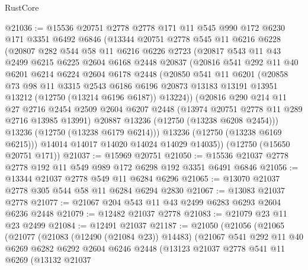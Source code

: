 \begin{lexlean}{RustCore}
\begin{coremodule}
@21036 := @15536
    @20751
    @2778
    @2778
    @171
    @11
    @545
    @990
    @172
    @6230
    @171
    @3351
    @6492
    @6846
    (@13344
      @20751
      @2778
      @545
      @11
      @6216
      @6228
      (@20807
        @282
        @544
        @58
        @11
        @6216
        @6226
        @2723
        (@20817
          @543
          @11
          @43
          @2499
          @6215
          @6225
          @2604
          @6168
          @2448
          @20837
          (@20816
            @541
            @292
            @11
            @40
            @6201
            @6214
            @6224
            @2604
            @6178
            @2448
            (@20850
              @541
              @11
              @6201
              (@20858
                @73
                @98
                @11
                @3315
                @2543
                @6186
                @6196
                @20873
                @13183
                @13191
                @13951
                @13212
                (@12750 (@13214 @6196 @6187))
                @13224))
            (@20816
              @290
              @214
              @11
              @27
              @2716
              @2454
              @2509
              @2604
              @6207
              @2448
              (@13974 @20751 @2778 @11 @289 @2716 @13985 @13991)
              @20887
              @13236
              (@12750 (@13238 @6208 @2454)))
            @13236
            (@12750 (@13238 @6179 @6214)))
          @13236
          (@12750 (@13238 @6169 @6215)))
        @14014
        @14017
        @14020
        @14024
        @14029
        @14035))
    (@12750 (@15650 @20751 @171))
@21037 := @15969 @20751
@21050 := @15536 @21037 @2778 @2778 @192 @11 @549 @989 @172 @6298 @192 @3351 @6491 @6846
@21056 := @13344 @21037 @2778 @549 @11 @6284 @6296
@21065 := @13070 @21037 @2778 @305 @544 @58 @11 @6284 @6294 @2830
@21067 := @13083 @21037 @2778
@21077 := @21067 @204 @543 @11 @43 @2499 @6283 @6293 @2604 @6236 @2448
@21079 := @12482 @21037 @2778
@21083 := @21079 @23 @11 @23 @2499
@21084 := @12491 @21037
@21187 := @21050
    (@21056
      (@21065
        (@21077
          (@21083 (@12490 (@21084 @23)) @14483)
          (@21067
            @541
            @292
            @11
            @40
            @6269
            @6282
            @6292
            @2604
            @6246
            @2448
            (@13123
              @21037
              @2778
              @541
              @11
              @6269
              (@13132
                @21037

\end{coremodule}
\end{lexlean}
